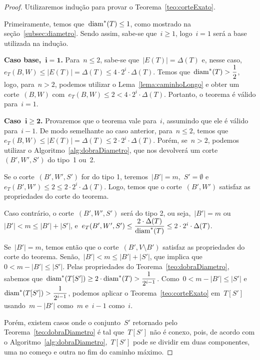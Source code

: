 	\medskip
	\medskip

	\begin{proof}
		Utilizaremos indução para provar o Teorema~\ref{teo:corteExato}.
		
		Primeiramente, temos que~${\mathrm{diam}^*(T)\le1}$, como mostrado 
		na seção~\ref{subsec:diametro}. 
		Sendo assim, sabe-se que~${i\ge1}$, logo~${i=1}$ será a base 
		utilizada na indução.
		
		\textbf{Caso base,~${\mathbf {i=1}}$.}
		Para~${n\le 2}$, sabe-se que~${|E(T)|=\Delta(T)}$ e, nesse
		caso,~${e_T(B,W)\le |E(T)|=\Delta(T)\le 4\cdot 2^i\cdot 
		\Delta(T)}$.
		Temos que~${\mathrm{diam}^*(T)>\dfrac{1}{2}}$, logo, para~$n>2$, 
		podemos utilizar o Lema~\ref{lema:caminhoLongo} e obter 
		um corte~$(B,W)$ 
		com~${e_T(B,W)\le 2 < 4\cdot 2^i\cdot \Delta(T)}$.
		Portanto, o teorema é válido para~${i=1}$.


		\textbf{Caso~${\mathbf{i\ge 2}}$.} Provaremos que 
		o teorema
		vale para~$i$, assumindo que ele é válido para~$i-1$.
		De modo semelhante ao caso anterior, para~${n\le2}$, temos 
		que~${e_T(B,W)\le |E(T)|=\Delta(T)\le 2\cdot 2^i\cdot 
		\Delta(T)}$.
		Porém, se~${n>2}$, podemos utilizar o 
		Algoritmo~\ref{alg:dobraDiametro}, que nos devolverá um 
		corte~$(B',W',S')$ do tipo~1 ou~2.

			Se o corte~$(B',W',S')$ for do tipo 1, 
			teremos~${|B'|=m}$,~${S'=\emptyset}$
			e~${e_T(B',W')\le2\le 2\cdot 2^i\cdot \Delta(T)}$.
			Logo, temos que o corte~$(B',W')$ satisfaz as propriedades
			do corte do teorema.

			Caso contrário, o corte~$(B',W',S')$ será do tipo 2, ou 
			seja,~${|B'|=m}$ ou~${|B'|<m\le |B'|+|S'|}$, 
			e~${e_T(B',W',S')\le \dfrac{2\cdot\Delta(T)}{\mathrm{diam}^*(T)}\le
			2\cdot2^i\cdot\Delta(T)}$.
			
			Se~${|B'|=m}$, temos então que o corte~$(B',V\setminus B')$ satisfaz
			as propriedades do corte do
			teorema.
			Senão,~${|B'|<m\le |B'|+|S'|}$, que implica
			que~${0<m-|B'|\le|S'|}$. 
			Pelas propriedades do Teorema~\ref{teo:dobraDiametro}, 
			sabemos que~${\mathrm{diam}^*(T[S'])\ge 2\cdot \mathrm{diam}^*(T)>
			\dfrac{1}{2^{i-1}}}$.
			Como~${0<m-|B'|\le|S'|}$ 
			e~${\mathrm{diam}^*(T[S'])>\dfrac{1}{2^{i-1}}}$, podemos aplicar o 
			Teorema~\ref{teo:corteExato} em~$T[S']$ 
			usando~${m-|B'|}$ como~$m$ e~$i-1$ como~$i$.
			
			Porém, existem casos onde o conjunto~$S'$ retornado 
			pelo Teorema~\ref{teo:dobraDiametro} é tal que~$T[S']$ 
			não é conexo, 
			pois, de acordo com o 
			Algoritmo~\ref{alg:dobraDiametro},~$T[S']$ pode se 
			dividir em duas componentes, uma no começo e outra
			no fim do caminho máximo. 


\end{proof}
